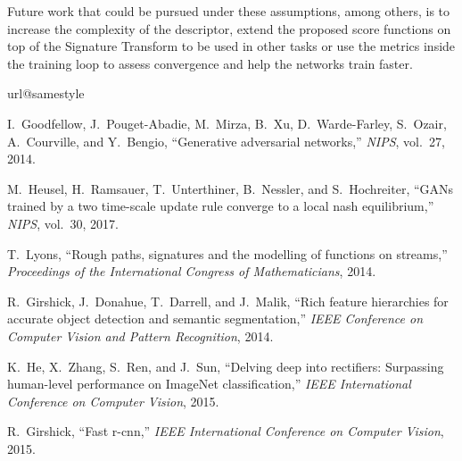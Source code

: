 \documentclass[lettersize,journal]{IEEEtran}
\begin{document}
Future work that could be pursued under these assumptions, among others, is to increase the complexity of the descriptor, extend the proposed score functions on top of the Signature Transform to be used in other tasks or use the metrics inside the training loop to assess convergence and help the networks train faster.



\begin{thebibliography}{10}
\providecommand{\url}[1]{#1}
\csname url@samestyle\endcsname
\providecommand{\newblock}{\relax}
\providecommand{\bibinfo}[2]{#2}
\providecommand{\BIBentrySTDinterwordspacing}{\spaceskip=0pt\relax}
\providecommand{\BIBentryALTinterwordstretchfactor}{4}
\providecommand{\BIBentryALTinterwordspacing}{\spaceskip=\fontdimen2\font plus
\BIBentryALTinterwordstretchfactor\fontdimen3\font minus
  \fontdimen4\font\relax}
\providecommand{\BIBforeignlanguage}[2]{{\expandafter\ifx\csname l@#1\endcsname\relax
\typeout{** WARNING: IEEEtran.bst: No hyphenation pattern has been}\typeout{** loaded for the language `#1'. Using the pattern for}\typeout{** the default language instead.}\else
\language=\csname l@#1\endcsname
\fi
#2}}
\providecommand{\BIBdecl}{\relax}
\BIBdecl

I.~Goodfellow, J.~Pouget-Abadie, M.~Mirza, B.~Xu, D.~Warde-Farley, S.~Ozair,
  A.~Courville, and Y.~Bengio, ``Generative adversarial networks,''
  \emph{NIPS}, vol.~27, 2014.

M.~Heusel, H.~Ramsauer, T.~Unterthiner, B.~Nessler, and S.~Hochreiter, ``{GANs}
  trained by a two time-scale update rule converge to a local nash
  equilibrium,'' \emph{NIPS}, vol.~30, 2017.

T.~Lyons, ``Rough paths, signatures and the modelling of functions on
  streams,'' \emph{Proceedings of the International Congress of
  Mathematicians}, 2014.

R.~Girshick, J.~Donahue, T.~Darrell, and J.~Malik, ``Rich feature hierarchies
  for accurate object detection and semantic segmentation,'' \emph{IEEE
  Conference on Computer Vision and Pattern Recognition}, 2014.

K.~He, X.~Zhang, S.~Ren, and J.~Sun, ``Delving deep into rectifiers: Surpassing
  human-level performance on {ImageNet} classification,'' \emph{IEEE
  International Conference on Computer Vision}, 2015.

R.~Girshick, ``Fast r-cnn,'' \emph{{IEEE} International Conference on Computer
  Vision}, 2015.


\end{thebibliography}
\end{document}
